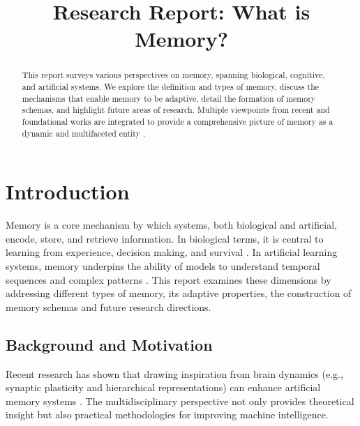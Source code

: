 \documentclass{article}
\title{Research Report: What is Memory?}
\author{}
\date{}
\begin{document}
\maketitle

\begin{abstract}
This report surveys various perspectives on memory, spanning biological, cognitive, and artificial systems. We explore the definition and types of memory, discuss the mechanisms that enable memory to be adaptive, detail the formation of memory schemas, and highlight future areas of research. Multiple viewpoints from recent and foundational works are integrated to provide a comprehensive picture of memory as a dynamic and multifaceted entity \parencite{kabir2024deepreinforcementlearningtimescale, wakeling2004adaptivityperlearning, hoppensteadt2020frequencyphasepotentialforcedstno, lakhman2012neuroevolutionresultsemergenceshortterm, neves2023volatilememorymotifsminimal, bai2022saliencyaugmentedmemorycompletioncontinual, jitsev2010experiencedrivenformationpartsbasedrepresentations, schillaci2020predictionerrordrivenmemoryconsolidation, rannentriki2024revisitingdynamicevaluationonline, banino2020memodeepnetworkflexible}.
\end{abstract}

\section{Introduction}
\label{sec:intro}
Memory is a core mechanism by which systems, both biological and artificial, encode, store, and retrieve information. In biological terms, it is central to learning from experience, decision making, and survival \parencite{wakeling2004adaptivityperlearning, jitsev2010experiencedrivenformationpartsbasedrepresentations}. In artificial learning systems, memory underpins the ability of models to understand temporal sequences and complex patterns \parencite{kabir2024deepreinforcementlearningtimescale, rannentriki2024revisitingdynamicevaluationonline}. This report examines these dimensions by addressing different types of memory, its adaptive properties, the construction of memory schemas and future research directions.

\subsection{Background and Motivation}
Recent research has shown that drawing inspiration from brain dynamics (e.g., synaptic plasticity and hierarchical representations) can enhance artificial memory systems \parencite{banino2020memodeepnetworkflexible, schillaci2020predictionerrordrivenmemoryconsolidation}. The multidisciplinary perspective not only provides theoretical insight but also practical methodologies for improving machine intelligence.
\end{document}
